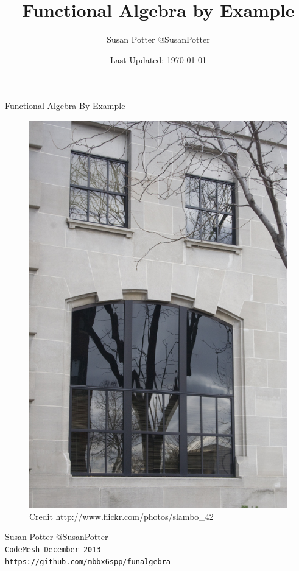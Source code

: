 \documentclass[compress]{beamer}
\title{Functional Algebra by Example}
\date{Last Updated: \today}
\author{Susan Potter \small{@SusanPotter}}
\begin{document}
\begin{frame}{Functional Algebra By Example}
  \begin{figure}
    \includegraphics[height=0.6\textheight]{assets/castleface.jpg}
    \caption{\tiny{Credit http://www.flickr.com/photos/slambo\_42}}
  \end{figure}
  \begin{center}
  Susan Potter \small{@SusanPotter} \\
  \tt{CodeMesh} \small{December 2013} \\
  \small{https://github.com/mbbx6spp/funalgebra}
  \end{center}
\end{frame}
\end{document}
